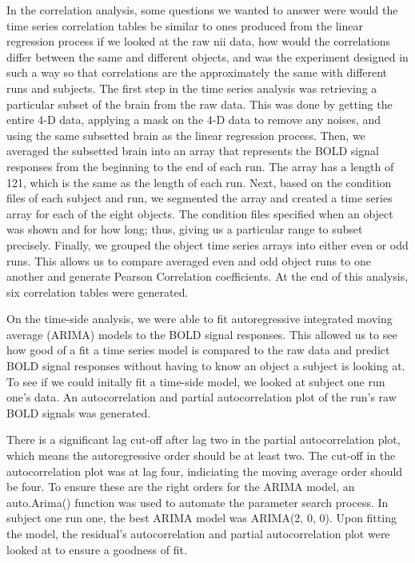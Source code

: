 \documentclass[11pt,twocolumn]{article}
\begin{document}
In the correlation analysis, some questions we wanted to answer were
would the time series correlation tables be similar to ones produced from
the linear regression process if we looked at the raw nii data, how would
the correlations differ between the same and different objects, and was the
experiment designed in such a way so that correlations are the approximately
the same with different runs and subjects. The first step in the time series
analysis was retrieving a particular subset of the brain from the raw data.
This was done by getting the entire 4-D data, applying a mask on the 4-D data
to remove any noises, and using the same subsetted brain as the linear
regression process. Then, we averaged the subsetted brain into an array that
represents the BOLD signal responses from the beginning to the end of each run.
The array has a length of 121, which is the same as the length of each run.
Next, based on the condition files of each subject and run, we segmented the
array and created a time series array for each of the eight objects. The
condition files specified when an object was shown and for how long; thus,
giving us a particular range to subset precisely. Finally, we grouped the
object time series arrays into either even or odd runs. This allows us to
compare averaged even and odd object runs to one another and generate
Pearson Correlation coefficients. At the end of this analysis, six correlation
tables were generated.

On the time-side analysis, we were able to fit autoregressive integrated
moving average (ARIMA) models to the BOLD signal responses. This allowed us to
see how good of a fit a time series model is compared to the raw data and 
predict BOLD signal responses without having to know an object a subject is 
looking at. To see if we could initally fit a time-side model, we looked at
subject one run one's data. An autocorrelation and partial autocorrelation 
plot of the run's raw BOLD signals was generated. 

There is a significant lag cut-off after lag two in the partial autocorrelation plot, 
which means the autoregressive order should be at least two. The cut-off in 
the autocorrelation plot was at lag four, indiciating the moving average 
order should be four. To ensure these are the right orders for the ARIMA model, 
an auto.Arima() function was used to automate the parameter search process. 
In subject one run one, the best ARIMA model was ARIMA(2, 0, 0). 
Upon fitting the model, the residual's autocorrelation and partial 
autocorrelation plot were looked at to ensure a goodness of fit. 
\end{document}
